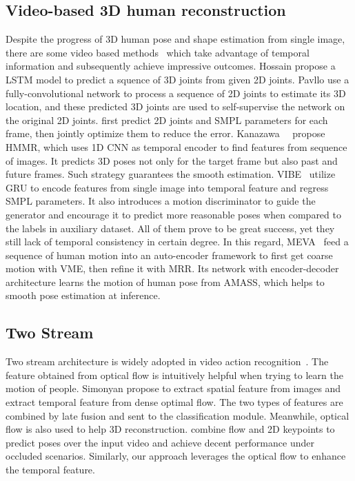 \documentclass[10pt,twocolumn,letterpaper]{article}
\begin{document}
\subsection{Video-based 3D human reconstruction}
Despite the progress of 3D human pose and shape estimation from single image, there are some video based methods~\cite{kanazawa2019learning,kocabas2020vibe,luo20203d,dabral2018learning,hossain2018exploiting,mehta2018single,pavllo20193d} which take advantage of temporal information and subsequently achieve impressive outcomes. Hossain\etal\cite{hossain2018exploiting} propose a LSTM model to predict a squence of 3D joints from given 2D joints. Pavllo\etal\cite{pavllo20193d} use a fully-convolutional network to process a sequence of 2D joints to estimate its 3D location, and these predicted 3D joints are used to self-supervise the network on the original 2D joints. \cite{arnab2019exploiting} first predict 2D joints and SMPL parameters for each frame, then jointly optimize them to reduce the error. Kanazawa~\etal~\cite{kanazawa2019learning} propose HMMR, which uses 1D CNN as temporal encoder to find features from sequence of images. It predicts 3D poses not only for the target frame but also past and future frames. Such strategy guarantees the smooth estimation. VIBE~\cite{kocabas2020vibe} utilize GRU to encode features from single image into temporal feature and regress SMPL parameters. It also introduces a motion discriminator to guide the generator and encourage it to predict more reasonable poses when compared to the labels in auxiliary dataset. All of them prove to be great success, yet they still lack of temporal consistency in certain degree. In this regard, MEVA~\cite{luo20203d} feed a sequence of human motion into an auto-encoder framework to first get coarse motion with VME, then refine it with MRR. Its network with encoder-decoder architecture learns the motion of human pose from AMASS\cite{mahmood2019amass}, which helps to smooth pose estimation at inference.
\subsection{Two Stream}
Two stream architecture is widely adopted in video action recognition~\cite{simonyan2014two,christoph2016spatiotemporal,lan2017deep,diba2017deep}. The feature obtained from optical flow is intuitively helpful when trying to learn the motion of people. Simonyan\cite{simonyan2014two} propose to extract spatial feature from images and extract temporal feature from dense optimal flow. The two types of features are combined by late fusion and sent to the classification module. Meanwhile, optical flow is also used to help 3D reconstruction. \cite{doersch2019sim2real} combine flow and 2D keypoints to predict poses over the input video and achieve decent performance under occluded scenarios. Similarly, our approach leverages the optical flow to enhance the temporal feature.
\end{document}
